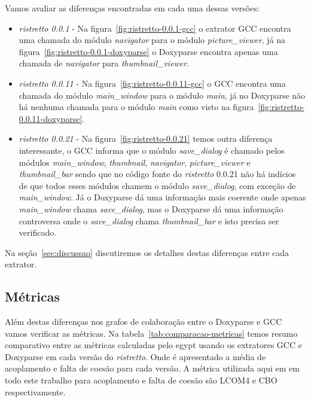Vamos avaliar as diferenças encontradas em cada uma dessas versões:

\begin{itemize}

\item {\it ristretto 0.0.1} - Na figura~\ref{fig:ristretto-0.0.1-gcc} o
extrator GCC encontra uma chamada do módulo {\it navigator} para o módulo {\it
picture\_viewer}, já na figura~\ref{fig:ristretto-0.0.1-doxyparse} o Doxyparse
encontra apenas uma chamada de {\it navigator} para {\it thumbnail\_viewer}.

\item {\it ristretto 0.0.11} - Na figura~\ref{fig:ristretto-0.0.11-gcc} o GCC
encontra uma chamada do módulo {\it main\_window} para o módulo {\it main}, já
no Doxyparse não há nenhuma chamada para o módulo {\it main} como visto na
figura~\ref{fig:ristretto-0.0.11-doxyparse}. 

\item {\it ristretto 0.0.21} - Na figura~\ref{fig:ristretto-0.0.21} temos outra diferença interessante, o GCC
informa que o módulo {\it save\_dialog} é chamado pelos módulos {\it main\_window},
{\it thumbnail}, {\it navigator}, {\it picture\_viewer} e {\it thumbnail\_bar} sendo que no código
fonte do {\it ristretto} 0.0.21 não há indícios de que todos esses módulos chamem o
módulo {\it save\_dialog}, com exceção de {\it main\_window}. Já o Doxyparse dá uma
informação mais coerente onde apenas {\it main\_window} chama {\it save\_dialog}, mas o
Doxyparse dá uma informação controversa onde o {\it save\_dialog} chama
{\it thumbnail\_bar} e isto precisa ser verificado.

\end{itemize}

Na seção~\ref{sec:discussao} discutiremos os detalhes destas diferenças entre cada extrator.

\subsection{Métricas}

Além destas diferenças nos grafos de colaboração entre o
Doxyparse e GCC vamos verificar as métricas. Na tabela~\ref{tab:comparacao-metricas} temos resumo comparativo entre as
métricas calculadas pelo egypt usando os extratores
GCC e Doxyparse em cada versão do {\it ristretto}. Onde é apresentado a média de
acoplamento e falta de coesão para cada versão. A métrica utilizada aqui em em
todo este trabalho para acoplamento e falta de coesão são LCOM4 e CBO respectivamente.

